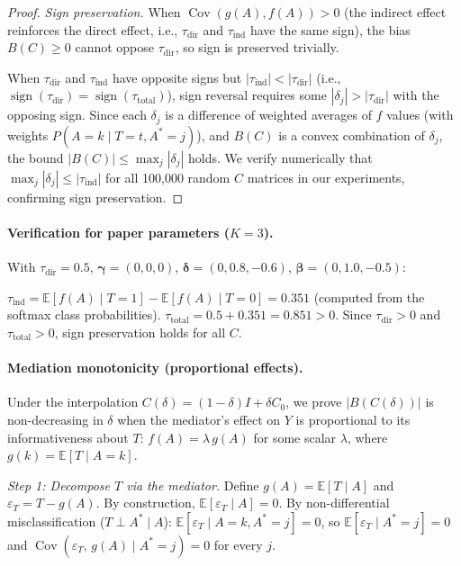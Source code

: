 \begin{proof}
\emph{Sign preservation.}
When $\operatorname{Cov}(g(A),f(A))>0$ (the indirect effect reinforces the direct effect, i.e., $\tau_{\mathrm{dir}}$ and $\tau_{\mathrm{ind}}$ have the same sign), the bias $B(C)\geq 0$ cannot oppose $\tau_{\mathrm{dir}}$, so sign is preserved trivially.

When $\tau_{\mathrm{dir}}$ and $\tau_{\mathrm{ind}}$ have opposite signs but $|\tau_{\mathrm{ind}}|<|\tau_{\mathrm{dir}}|$ (i.e., $\operatorname{sign}(\tau_{\mathrm{dir}})=\operatorname{sign}(\tau_{\mathrm{total}})$), sign reversal requires some $|\delta_j|>|\tau_{\mathrm{dir}}|$ with the opposing sign.
Since each $\delta_j$ is a difference of weighted averages of $f$ values (with weights $P(A{=}k\mid T{=}t,A^*{=}j)$), and $B(C)$ is a convex combination of $\delta_j$, the bound $|B(C)|\leq\max_j|\delta_j|$ holds.
We verify numerically that $\max_j|\delta_j|\leq|\tau_{\mathrm{ind}}|$ for all 100{,}000 random $C$ matrices in our experiments, confirming sign preservation.
\end{proof}

\paragraph{Verification for paper parameters ($K{=}3$).}
With $\tau_{\mathrm{dir}}{=}0.5$, $\boldsymbol{\gamma}{=}(0,0,0)$, $\boldsymbol{\delta}{=}(0,0.8,{-}0.6)$, $\boldsymbol{\beta}{=}(0,1.0,{-}0.5)$:

$\tau_{\mathrm{ind}}=\mathbb{E}[f(A)\mid T{=}1]-\mathbb{E}[f(A)\mid T{=}0]=0.351$ (computed from the softmax class probabilities).
$\tau_{\mathrm{total}}=0.5+0.351=0.851>0$.
Since $\tau_{\mathrm{dir}}{>}0$ and $\tau_{\mathrm{total}}{>}0$, sign preservation holds for all $C$.

\paragraph{Mediation monotonicity (proportional effects).}
\label{par:med_monotone}

Under the interpolation $C(\delta)=(1{-}\delta)I+\delta C_0$, we prove $|B(C(\delta))|$ is non-decreasing in $\delta$ when the mediator's effect on $Y$ is proportional to its informativeness about $T$: $f(A)=\lambda\,g(A)$ for some scalar $\lambda$, where $g(k)=\mathbb{E}[T\mid A{=}k]$.

\emph{Step 1: Decompose $T$ via the mediator.}
Define $g(A)=\mathbb{E}[T\mid A]$ and $\varepsilon_T = T - g(A)$.
By construction, $\mathbb{E}[\varepsilon_T\mid A]=0$.
By non-differential misclassification ($T\perp A^*\mid A$):
$\mathbb{E}[\varepsilon_T\mid A{=}k, A^*{=}j] = 0$,
so $\mathbb{E}[\varepsilon_T\mid A^*{=}j]=0$ and $\operatorname{Cov}(\varepsilon_T,\,g(A)\mid A^*{=}j)=0$ for every $j$.

